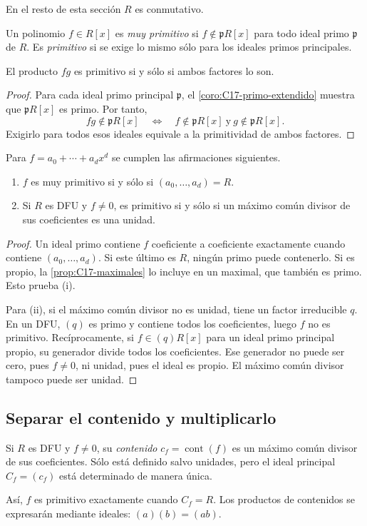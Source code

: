 En el resto de esta sección $R$ es conmutativo.
\begin{defi}
Un polinomio $f\in R[x]$ es \emph{muy primitivo} si $f\notin\mathfrak pR[x]$ para todo ideal primo $\mathfrak p$ de $R$. Es \emph{primitivo} si se exige lo mismo sólo para los ideales primos principales.
\end{defi}
\begin{lema}\label{lema:C17-producto-primitivo}
El producto $fg$ es primitivo si y sólo si ambos factores lo son.
\end{lema}
\begin{proof}
Para cada ideal primo principal $\mathfrak p$, el \cref{coro:C17-primo-extendido} muestra que $\mathfrak pR[x]$ es primo. Por tanto,
\[
fg\notin\mathfrak pR[x]
\quad\Longleftrightarrow\quad
f\notin\mathfrak pR[x]\ \text{y}\ g\notin\mathfrak pR[x].
\]
Exigirlo para todos esos ideales equivale a la primitividad de ambos factores.
\end{proof}
\begin{lema}\label{lema:C17-criterios-primitivo}
Para $f=a_0+\cdots+a_dx^d$ se cumplen las afirmaciones siguientes.
\begin{enumerate}[label=\textup{(\roman*)}]
\item $f$ es muy primitivo si y sólo si $(a_0,\ldots,a_d)=R$.
\item Si $R$ es DFU y $f\ne0$, es primitivo si y sólo si un máximo común divisor de sus coeficientes es una unidad.
\end{enumerate}
\end{lema}
\begin{proof}
Un ideal primo contiene $f$ coeficiente a coeficiente exactamente cuando contiene $(a_0,\ldots,a_d)$. Si este último es $R$, ningún primo puede contenerlo. Si es propio, la \cref{prop:C17-maximales} lo incluye en un maximal, que también es primo. Esto prueba (i).

Para (ii), si el máximo común divisor no es unidad, tiene un factor irreducible $q$. En un DFU, $(q)$ es primo y contiene todos los coeficientes, luego $f$ no es primitivo. Recíprocamente, si $f\in(q)R[x]$ para un ideal primo principal propio, su generador divide todos los coeficientes. Ese generador no puede ser cero, pues $f\ne0$, ni unidad, pues el ideal es propio. El máximo común divisor tampoco puede ser unidad.
\end{proof}

\subsection{Separar el contenido y multiplicarlo}\label{tema:17-3-3}
\begin{defi}
Si $R$ es DFU y $f\ne0$, su \emph{contenido} $c_f=\operatorname{cont}(f)$ es un máximo común divisor de sus coeficientes. Sólo está definido salvo unidades, pero el ideal principal $C_f=(c_f)$ está determinado de manera única.
\end{defi}
Así, $f$ es primitivo exactamente cuando $C_f=R$. Los productos de contenidos se expresarán mediante ideales: $(a)(b)=(ab)$.

